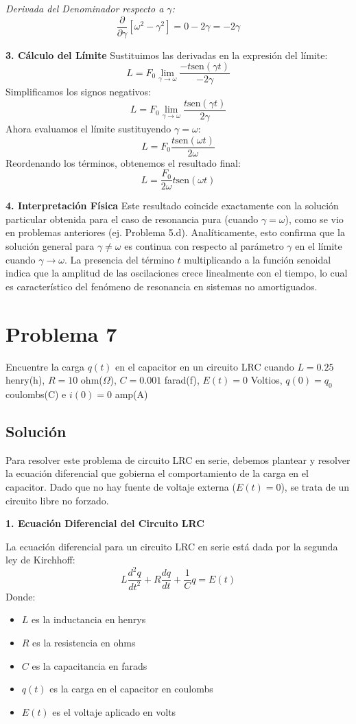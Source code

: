\documentclass[a4paper]{article}
\begin{document}
\textit{Derivada del Denominador respecto a $\gamma$:}
$$
\frac{\partial}{\partial \gamma} [\omega^2 - \gamma^2] = 0 - 2\gamma = -2\gamma
$$

\textbf{3. Cálculo del Límite}
Sustituimos las derivadas en la expresión del límite:
$$
L = F_0 \lim_{\gamma \to \omega} \frac{-t \text{sen}(\gamma t)}{-2\gamma}
$$
Simplificamos los signos negativos:
$$
L = F_0 \lim_{\gamma \to \omega} \frac{t \text{sen}(\gamma t)}{2\gamma}
$$
Ahora evaluamos el límite sustituyendo $\gamma = \omega$:
$$
L = F_0 \frac{t \text{sen}(\omega t)}{2\omega}
$$
Reordenando los términos, obtenemos el resultado final:
$$
L = \frac{F_0}{2\omega} t \text{sen}(\omega t)
$$

\textbf{4. Interpretación Física}
Este resultado coincide exactamente con la solución particular obtenida para el caso de resonancia pura (cuando $\gamma = \omega$), como se vio en problemas anteriores (ej. Problema 5.d). Analíticamente, esto confirma que la solución general para $\gamma \neq \omega$ es continua con respecto al parámetro $\gamma$ en el límite cuando $\gamma \to \omega$. La presencia del término $t$ multiplicando a la función senoidal indica que la amplitud de las oscilaciones crece linealmente con el tiempo, lo cual es característico del fenómeno de resonancia en sistemas no amortiguados.


\section{Problema 7}
Encuentre la carga $q(t)$ en el capacitor en un circuito LRC cuando $L= 0.25$ henry(h), $R= 10$ ohm($\Omega$), $C= 0.001$ farad(f), $E(t)= 0$ Voltios, $q(0)= q_0$ coulombs(C) e $i(0)= 0$ amp(A)

\subsection{Solución}
Para resolver este problema de circuito LRC en serie, debemos plantear y resolver la ecuación diferencial que gobierna el comportamiento de la carga en el capacitor. Dado que no hay fuente de voltaje externa ($E(t) = 0$), se trata de un circuito libre no forzado.

\textbf{1. Ecuación Diferencial del Circuito LRC}

La ecuación diferencial para un circuito LRC en serie está dada por la segunda ley de Kirchhoff:
$$
L\frac{d^2q}{dt^2} + R\frac{dq}{dt} + \frac{1}{C}q = E(t)
$$
Donde:
\begin{itemize}
    \item $L$ es la inductancia en henrys
    \item $R$ es la resistencia en ohms
    \item $C$ es la capacitancia en farads
    \item $q(t)$ es la carga en el capacitor en coulombs
    \item $E(t)$ es el voltaje aplicado en volts
\end{itemize}
\end{document}
